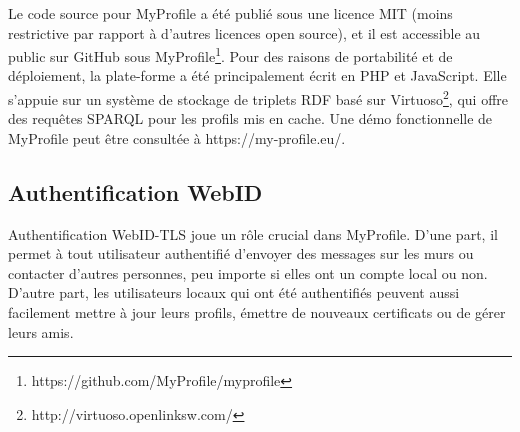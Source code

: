 Le code source pour MyProfile a été publié sous une licence MIT (moins restrictive par rapport à d'autres licences open source), et il est accessible au public sur GitHub sous MyProfile\footnote{https://github.com/MyProfile/myprofile}. Pour des raisons de portabilité et de déploiement, la plate-forme a été principalement écrit en PHP et JavaScript. Elle s'appuie sur un système de stockage de triplets RDF basé sur Virtuoso\footnote{http://virtuoso.openlinksw.com/}, qui offre des requêtes SPARQL pour les profils mis en cache. Une démo fonctionnelle de MyProfile peut être consultée à https://my-profile.eu/.

\subsection*{Authentification WebID}
Authentification WebID-TLS joue un rôle crucial dans MyProfile. D'une part, il permet à tout utilisateur authentifié d'envoyer des messages sur les murs ou contacter d'autres personnes, peu importe si elles ont un compte local ou non. D'autre part, les utilisateurs locaux qui ont été authentifiés peuvent aussi facilement mettre à jour leurs profils, émettre de nouveaux certificats ou de gérer leurs amis.\\


